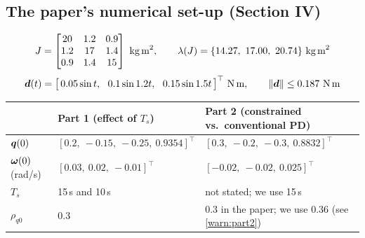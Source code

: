 \begin{center}
\end{center}

\subsection{The paper's numerical set-up (Section IV)}

\begin{equation}\label{eq:Jpaper}
J=\begin{bmatrix}20&1.2&0.9\\1.2&17&1.4\\0.9&1.4&15\end{bmatrix}\ \text{kg\,m}^2,\qquad
\lambda(J)=\{14.27,\ 17.00,\ 20.74\}\ \text{kg\,m}^2
\end{equation}
\begin{equation}\label{eq:dpaper}
\vd(t)=\big[\,0.05\sin t,\ \ 0.1\sin 1.2t,\ \ 0.15\sin 1.5t\,\big]^\top\ \text{N\,m},\qquad \|\vd\|\le0.187\ \text{N\,m}
\end{equation}

\begin{center}\small
\begin{tabularx}{\linewidth}{@{}l X X@{}}
\toprule
& \textbf{Part 1} (effect of $T_s$) & \textbf{Part 2} (constrained vs.\ conventional PD)\\
\midrule
$\bm{q}(0)$ & $[0.2,\ -0.15,\ -0.25,\ 0.9354]^\top$ & $[0.3,\ -0.2,\ -0.3,\ 0.8832]^\top$\\
$\bm{\omega}(0)$ (rad/s) & $[0.03,\ 0.02,\ -0.01]^\top$ & $[-0.02,\ -0.02,\ 0.025]^\top$\\
$T_s$ & 15\,s and 10\,s & not stated; we use 15\,s\\
$\rho_{q0}$ & 0.3 & 0.3 in the paper; we use 0.36 (see \cref{warn:part2})\\
\bottomrule
\end{tabularx}
\end{center}

